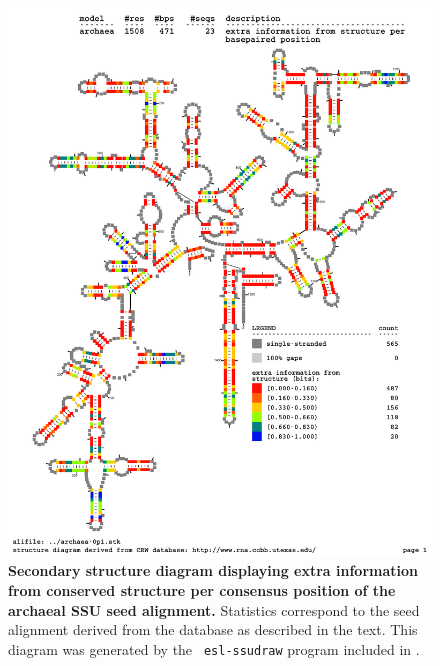 \begin{figure}
\begin{center}
\includegraphics[width=5.5in]{../../seeds/ss-diagrams/archaea-0p1-struct}
\end{center}
\caption[Secondary structure diagram displaying extra information 
  from conserved structure per consensus position of the archaeal SSU seed
  alignment]{\textbf{Secondary structure diagram displaying extra
  information from conserved structure per consensus position of the archaeal SSU seed
  alignment.} Statistics correspond to the  seed
  alignment derived from the  database \cite{CannoneGutell02}
  as described in the text. This diagram was generated by the {\tt
  esl-ssudraw} program included in .}
\label{fig:arcsinfo}
\end{figure}


